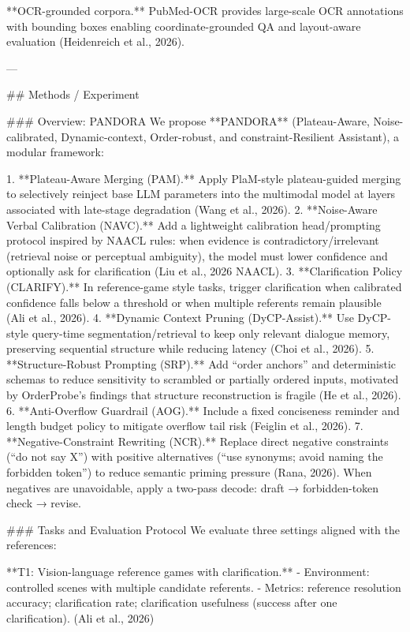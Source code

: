 **OCR-grounded corpora.** PubMed-OCR provides large-scale OCR annotations with bounding boxes enabling coordinate-grounded QA and layout-aware evaluation (Heidenreich et al., 2026).  

---

## Methods / Experiment  

### Overview: PANDORA  
We propose **PANDORA** (Plateau-Aware, Noise-calibrated, Dynamic-context, Order-robust, and constraint-Resilient Assistant), a modular framework:

1. **Plateau-Aware Merging (PAM).** Apply PlaM-style plateau-guided merging to selectively reinject base LLM parameters into the multimodal model at layers associated with late-stage degradation (Wang et al., 2026).  
2. **Noise-Aware Verbal Calibration (NAVC).** Add a lightweight calibration head/prompting protocol inspired by NAACL rules: when evidence is contradictory/irrelevant (retrieval noise or perceptual ambiguity), the model must lower confidence and optionally ask for clarification (Liu et al., 2026 NAACL).  
3. **Clarification Policy (CLARIFY).** In reference-game style tasks, trigger clarification when calibrated confidence falls below a threshold or when multiple referents remain plausible (Ali et al., 2026).  
4. **Dynamic Context Pruning (DyCP-Assist).** Use DyCP-style query-time segmentation/retrieval to keep only relevant dialogue memory, preserving sequential structure while reducing latency (Choi et al., 2026).  
5. **Structure-Robust Prompting (SRP).** Add “order anchors” and deterministic schemas to reduce sensitivity to scrambled or partially ordered inputs, motivated by OrderProbe’s findings that structure reconstruction is fragile (He et al., 2026).  
6. **Anti-Overflow Guardrail (AOG).** Include a fixed conciseness reminder and length budget policy to mitigate overflow tail risk (Feiglin et al., 2026).  
7. **Negative-Constraint Rewriting (NCR).** Replace direct negative constraints (“do not say X”) with positive alternatives (“use synonyms; avoid naming the forbidden token”) to reduce semantic priming pressure (Rana, 2026). When negatives are unavoidable, apply a two-pass decode: draft → forbidden-token check → revise.

### Tasks and Evaluation Protocol  
We evaluate three settings aligned with the references:

**T1: Vision-language reference games with clarification.**  
- Environment: controlled scenes with multiple candidate referents.  
- Metrics: reference resolution accuracy; clarification rate; clarification usefulness (success after one clarification). (Ali et al., 2026)

